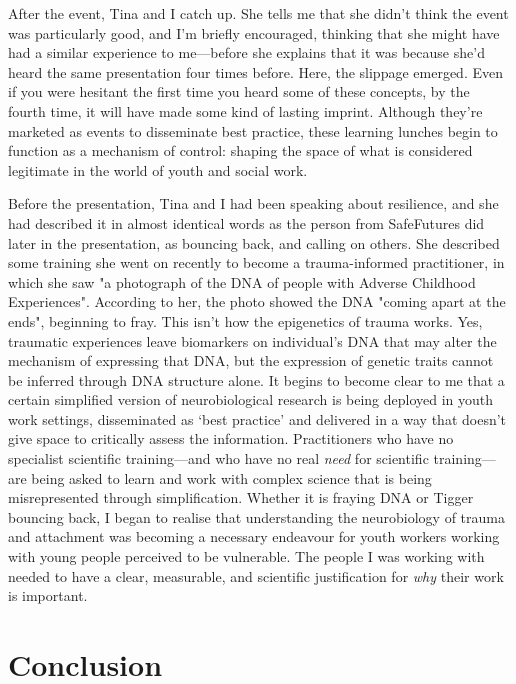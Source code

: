 After the event, Tina and I catch up. She tells me that she didn't think the event was particularly good, and I'm briefly encouraged, thinking that she might have had a similar experience to me—before she explains that it was because she'd heard the same presentation four times before. Here, the slippage emerged. Even if you were hesitant the first time you heard some of these concepts, by the fourth time, it will have made some kind of lasting imprint. Although they're marketed as events to disseminate best practice, these learning lunches begin to function as a mechanism of control: shaping the space of what is considered legitimate in the world of youth and social work. 

Before the presentation, Tina and I had been speaking about resilience, and she had described it in almost identical words as the person from SafeFutures did later in the presentation, as bouncing back, and calling on others. She described some training she went on recently to become a trauma-informed practitioner, in which she saw "a photograph of the DNA of people with Adverse Childhood Experiences". According to her, the photo showed the DNA "coming apart at the ends", beginning to fray. This isn't how the epigenetics of trauma works. Yes, traumatic experiences leave biomarkers on individual's DNA that may alter the mechanism of expressing that DNA, but the expression of genetic traits cannot be inferred through DNA structure alone. It begins to become clear to me that a certain simplified version of neurobiological research is being deployed in youth work settings, disseminated as `best practice' and delivered in a way that doesn't give space to critically assess the information. Practitioners who have no specialist scientific training—and who have no real \textit{need} for scientific training—are being asked to learn and work with complex science that is being misrepresented through simplification. Whether it is fraying DNA or Tigger bouncing back, I began to realise that understanding the neurobiology of trauma and attachment was becoming a necessary endeavour for youth workers working with young people perceived to be vulnerable. The people I was working with needed to have a clear, measurable, and scientific justification for \textit{why} their work is important.

\section{Conclusion}

